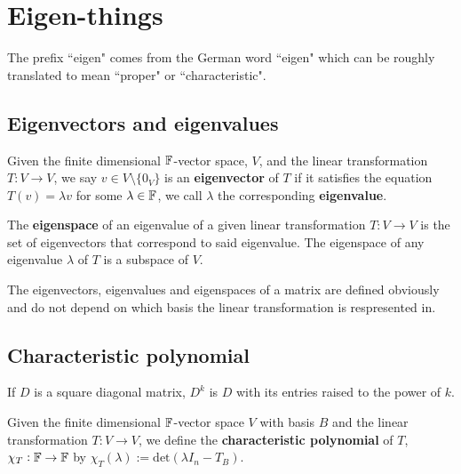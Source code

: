 \documentclass[../Year1.tex]{subfiles}
\begin{document}
\section{Eigen-things}
The prefix ``eigen" comes from the German word ``eigen" which can be roughly translated to mean ``proper" or ``characteristic".

\subsection{Eigenvectors and eigenvalues}

\begin{definition}
    Given the finite dimensional $\mathbb{F}$-vector space, $V$, and the linear transformation $T:V\rightarrow V$, we say $v\in V\setminus{\{0_V\}}$ is an \textbf{eigenvector} of $T$ if it satisfies the equation $T(v)=\lambda v$ for some $\lambda \in \mathbb{F}$, we call $\lambda$ the corresponding \textbf{eigenvalue}.
\end{definition}

\begin{definition}[Eigenspace]
    The \textbf{eigenspace} of an eigenvalue of a given linear transformation $T:V\rightarrow V$ is the set of eigenvectors that correspond to said eigenvalue. The eigenspace of any eigenvalue $\lambda$  of $T$ is a subspace of $V$.
\end{definition}

\begin{remark}
    The eigenvectors, eigenvalues and eigenspaces of a matrix are defined obviously and do not depend on which basis the linear transformation is respresented in.
\end{remark}

\subsection{Characteristic polynomial}

\begin{theorem}
    If $D$ is a square diagonal matrix, $D^k$ is $D$ with its entries raised to the power of $k$.
\end{theorem}

\begin{definition}
    Given the finite dimensional $\mathbb{F}$-vector space $V$ with basis $B$ and the linear transformation $T:V\rightarrow V$, we define the \textbf{characteristic polynomial} of $T$, $\chi_T:\mathbb{F}\rightarrow\mathbb{F}$ by $\chi_T(\lambda):= \text{det}(\lambda I_n-T_B)$.
\end{definition}
\end{document}
